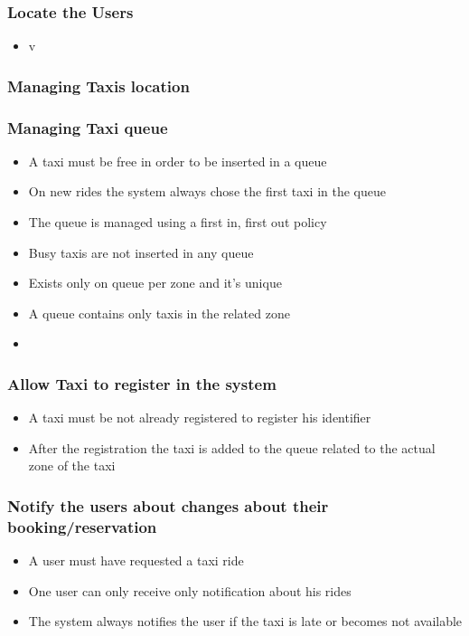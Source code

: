 		\subsubsection{Locate the Users}
		\begin{itemize}
		\item v
		\end{itemize}
		\subsubsection{Managing Taxis location}
		\subsubsection{Managing Taxi queue}
		\begin{itemize}
			\item A taxi must be free in order to be inserted in a queue
			\item On new rides the system always chose the first taxi in the queue
			\item The queue is managed using a first in, first out policy
			\item Busy taxis are not inserted in any queue
			\item Exists only on queue per zone and it's unique
			\item A queue contains only taxis in the related zone
			\item 
		\end{itemize}
		\subsubsection{Allow Taxi to register in the system}
		\begin{itemize}
			\item A taxi must be not already registered to register his identifier
			\item After the registration the taxi is added to the queue related to the actual zone of the taxi
		\end{itemize}
		\subsubsection{Notify the users about changes about their booking/reservation}
		\begin{itemize}
			\item A user must have requested a taxi ride
			\item One user can only receive only notification about his rides
			\item The system always notifies the user if the taxi is late or becomes not available
		\end{itemize}
